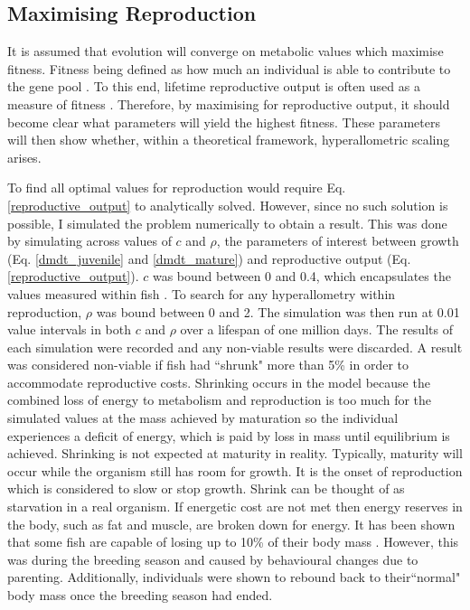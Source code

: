 \documentclass[a4paper, 11pt, hidelinks]{article} %
\begin{document}
	\subsection{Maximising Reproduction}
	It is assumed that evolution will converge on metabolic values which maximise fitness. 
	Fitness being defined as how much an individual is able to contribute to the gene pool \parencite{Speakman2008, Stearns2000}.  %
	To this end, lifetime reproductive output is often used as a measure of fitness \parencite{Charnov1991, Audzijonyte2018, Speakman2008, Stearns2000, Charnov2001, Tsoukali2016, Brown1993, Charnov2007}.  Therefore, by maximising for reproductive output, it should become clear what parameters will yield the highest fitness.  These parameters will then show whether, within a theoretical framework, hyperallometric scaling arises.
	
	To find all optimal values for reproduction would require Eq. \ref{reproductive_output} to analytically solved.  However, since no such solution is possible, I simulated the problem numerically to obtain a result.  This was done by simulating across values of $ c $ and $ \rho $, the parameters of interest between growth (Eq. \ref{dmdt_juvenile} and \ref{dmdt_mature}) and reproductive output (Eq. \ref{reproductive_output}).  $ c $ was bound between 0 and 0.4, which encapsulates the values measured within fish \parencite{Benoit2018, Roff1983, Fontoura2009}.  To search for any hyperallometry within reproduction, $ \rho $ was bound between 0 and 2.  
	The simulation was then run at 0.01 value intervals in both $c$ and $\rho$ over a lifespan of one million days.  The results of each simulation were recorded and any non-viable results were discarded.  A result was considered non-viable if fish had ``shrunk" more than 5\% in order to accommodate reproductive costs.  Shrinking occurs in the model because  the combined loss of energy to metabolism and reproduction is too much for the simulated values at the mass achieved by maturation so the individual experiences a deficit of energy, which is paid by loss in mass until equilibrium is achieved. %
	Shrinking is not expected at maturity in reality.  Typically, maturity will occur while the organism still has room for growth.  It is the onset of reproduction which is considered to slow or stop growth.  Shrink can be thought of as starvation in a real organism.  If energetic cost are not met then energy reserves in the body, such as fat and muscle, are broken down for energy.  It has been shown that some fish are capable of losing up to 10\% of their body mass \parencite{VandenBerghe1992}.  However, this was during the breeding season and caused by behavioural changes due to parenting.  Additionally, individuals were shown to rebound back to their``normal" body mass once the breeding season had ended.
	
\end{document}
